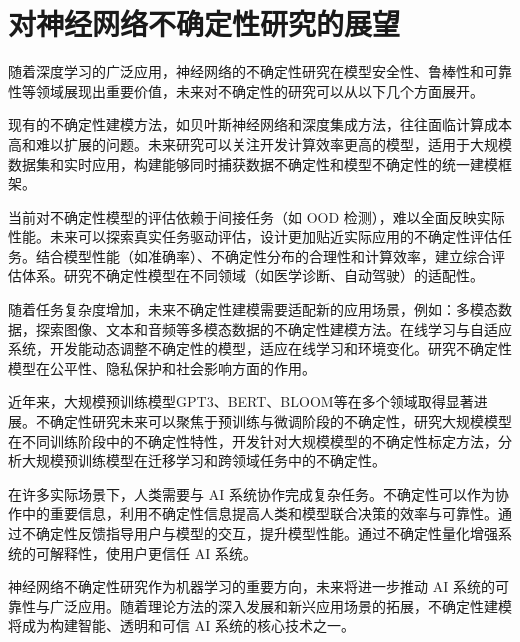 \section{对神经网络不确定性研究的展望}

随着深度学习的广泛应用，神经网络的不确定性研究在模型安全性、鲁棒性和可靠性等领域展现出重要价值，未来对不确定性的研究可以从以下几个方面展开。

现有的不确定性建模方法，如贝叶斯神经网络和深度集成方法，往往面临计算成本高和难以扩展的问题。未来研究可以关注开发计算效率更高的模型，适用于大规模数据集和实时应用，构建能够同时捕获数据不确定性和模型不确定性的统一建模框架。


当前对不确定性模型的评估依赖于间接任务（如 OOD 检测），难以全面反映实际性能。未来可以探索真实任务驱动评估，设计更加贴近实际应用的不确定性评估任务。结合模型性能（如准确率）、不确定性分布的合理性和计算效率，建立综合评估体系。研究不确定性模型在不同领域（如医学诊断、自动驾驶）的适配性。


随着任务复杂度增加，未来不确定性建模需要适配新的应用场景，例如：多模态数据，探索图像、文本和音频等多模态数据的不确定性建模方法。在线学习与自适应系统，开发能动态调整不确定性的模型，适应在线学习和环境变化。研究不确定性模型在公平性、隐私保护和社会影响方面的作用。

近年来，大规模预训练模型GPT3\cite{brown2020language}、BERT\cite{devlin2019bert}、BLOOM\cite{scao2022bloom}等在多个领域取得显著进展。不确定性研究未来可以聚焦于预训练与微调阶段的不确定性，研究大规模模型在不同训练阶段中的不确定性特性，开发针对大规模模型的不确定性标定方法，分析大规模预训练模型在迁移学习和跨领域任务中的不确定性。

在许多实际场景下，人类需要与 AI 系统协作完成复杂任务。不确定性可以作为协作中的重要信息，利用不确定性信息提高人类和模型联合决策的效率与可靠性。通过不确定性反馈指导用户与模型的交互，提升模型性能。通过不确定性量化增强系统的可解释性，使用户更信任 AI 系统。

神经网络不确定性研究作为机器学习的重要方向，未来将进一步推动 AI 系统的可靠性与广泛应用。随着理论方法的深入发展和新兴应用场景的拓展，不确定性建模将成为构建智能、透明和可信 AI 系统的核心技术之一。



